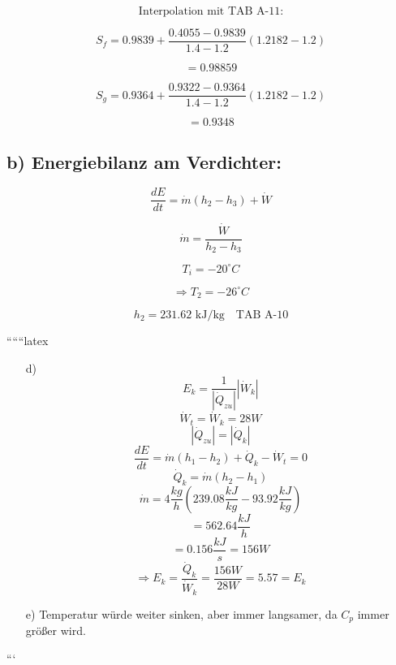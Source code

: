 \[
\text{Interpolation mit TAB A-11:}
\]

\[
S_f = 0.9839 + \frac{0.4055 - 0.9839}{1.4 - 1.2} (1.2182 - 1.2)
\]

\[
= 0.98859
\]

\[
S_g = 0.9364 + \frac{0.9322 - 0.9364}{1.4 - 1.2} (1.2182 - 1.2)
\]

\[
= 0.9348
\]

\subsection*{b) Energiebilanz am Verdichter:}

\[
\frac{dE}{dt} = \dot{m} (h_2 - h_3) + \dot{W}
\]

\[
\dot{m} = \frac{\dot{W}}{h_2 - h_3}
\]

\[
T_i = -20^\circ C
\]

\[
\Rightarrow T_2 = -26^\circ C
\]

\[
h_2 = 231.62 \text{ kJ/kg} \quad \text{TAB A-10}
\]

``````latex


\begin{itemize}
    \item[d)] \[
    E_k = \frac{1}{\left| \dot{Q}_{zu} \right|} \left| \dot{W}_k \right|
    \]
    \[
    \dot{W}_t = \dot{W}_k = 28W
    \]
    \[
    \left| \dot{Q}_{zu} \right| = \left| \dot{Q}_k \right|
    \]
    \[
    \frac{dE}{dt} = \dot{m} \left( h_1 - h_2 \right) + \dot{Q}_k - \dot{W}_t = 0
    \]
    \[
    \dot{Q}_k = \dot{m} \left( h_2 - h_1 \right)
    \]
    \[
    \dot{m} = 4 \frac{kg}{h} \left( 239.08 \frac{kJ}{kg} - 93.92 \frac{kJ}{kg} \right)
    \]
    \[
    = 562.64 \frac{kJ}{h}
    \]
    \[
    = 0.156 \frac{kJ}{s} = 156W
    \]
    \[
    \Rightarrow E_k = \frac{\dot{Q}_k}{\dot{W}_k} = \frac{156W}{28W} = 5.57 = E_k
    \]
    \item[e)] Temperatur würde weiter sinken, aber immer langsamer, da $C_p$ immer größer wird.
\end{itemize}

```